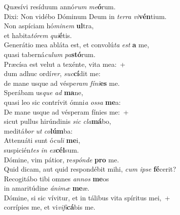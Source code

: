 \evenverse Quæsívi resíduum annó\textit{rum} \textit{me}\textbf{ó}rum.~\*\\
\evenverse Dixi: Non vidébo Dóminum Deum in \textit{ter}\textit{ra} \textit{vi}\textbf{vén}tium.\\
\oddverse Non aspíciam hó\textit{mi}\textit{nem} \textbf{ul}tra,~\*\\
\oddverse et habita\textit{tó}\textit{rem} \textit{qui}\textbf{é}tis.\\
\evenverse Generátio mea abláta est, et convolú\textit{ta} \textit{est} \textbf{a} me,~\*\\
\evenverse quasi taberná\textit{cu}\textit{lum} \textit{pa}\textbf{stó}rum.\\
\oddverse Præcísa est velut a texénte, vita mea:~+\\
\oddverse  dum adhuc ordí\textit{rer}, \textit{suc}\textbf{cí}dit me:~\*\\
\oddverse de mane usque ad véspe\textit{ram} \textit{fí}\textit{ni}\textbf{es} me.\\
\evenverse Sperábam us\textit{que} \textit{ad} \textbf{ma}ne,~\*\\
\evenverse quasi leo sic contrívit ómni\textit{a} \textit{os}\textit{sa} \textbf{me}a:\\
\oddverse De mane usque ad vésperam fínies me:~+\\
\oddverse  sicut pullus hirúndinis \textit{sic} \textit{cla}\textbf{má}bo,~\*\\
\oddverse meditá\textit{bor} \textit{ut} \textit{co}\textbf{lúm}ba:\\
\evenverse Attenuáti sunt ó\textit{cu}\textit{li} \textbf{me}i,~\*\\
\evenverse suspicién\textit{tes} \textit{in} \textit{ex}\textbf{cél}sum.\\
\oddverse Dómine, vim pátior, re\textit{spón}\textit{de} \textbf{pro} me.~\*\\
\oddverse Quid dicam, aut quid respondébit mihi, \textit{cum} \textit{i}\textit{pse} \textbf{fé}cerit?\\
\evenverse Recogitábo tibi omnes \textit{an}\textit{nos} \textbf{me}os~\*\\
\evenverse in amaritúdine \textit{á}\textit{ni}\textit{mæ} \textbf{me}æ.\\
\oddverse Dómine, si sic vívitur, et in tálibus vita spíritus mei,~+\\
\oddverse  corrípies me, et vi\textit{vi}\textit{fi}\textbf{cá}bis me.~\*\\
